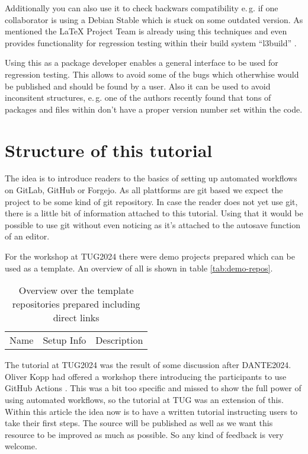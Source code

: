 \documentclass[final]{ltugboat}
\begin{document}
Additionally you can also use it to check backwars compatibility e.\,g. if one collaborator is using a Debian Stable which is stuck on some outdated version. 
As mentioned the \LaTeX{} Project Team is already using this techniques and even provides functionality for regression testing within their build system \enquote{l3build} \cite{l3build}.

Using this as a package developer enables a general interface to be used for regression testing.
This allows to avoid some of the bugs which otherwhise would be published and should be found by a user. 
Also it can be used to avoid inconsitent structures, e.\,g. one of the authors recently found that tons of packages and files within \TeXLive{} don't have a proper version number set within the code.

\section{Structure of this tutorial}

The idea is to introduce readers to the basics of setting up automated workflows on GitLab, GitHub or Forgejo.
As all plattforms are git based we expect the project to be some kind of git repository.
In case the reader does not yet use git, there is a little bit of information attached to this tutorial.
Using that it would be possible to use git without even noticing as it's attached to the autosave function of an editor. 

For the workshop at TUG2024 there were demo projects prepared which can be used as a template.
An overview of all is shown in table \ref{tab:demo-repos}.

\begin{table}
\caption{Overview over the template repositories prepared including direct links}
\begin{tabularx}{\linewidth}{llX}
Name & Setup Info & Description\\

\end{tabularx}
\end{table}



The tutorial at TUG2024 was the result of some discussion after DANTE2024.
Oliver Kopp had offered a workshop there introducing the participants to use GitHub Actions \cite{cicd-workshop-DANTE2024}. 
This was a bit too specific and missed to show the full power of using automated workflows, so the tutorial at TUG was an extension of this.
Within this article the idea now is to have a written tutorial instructing users to take their first steps.
The source will be published as well as we want this resource to be improved as much as possible.
So any kind of feedback is very welcome.
\end{document}
